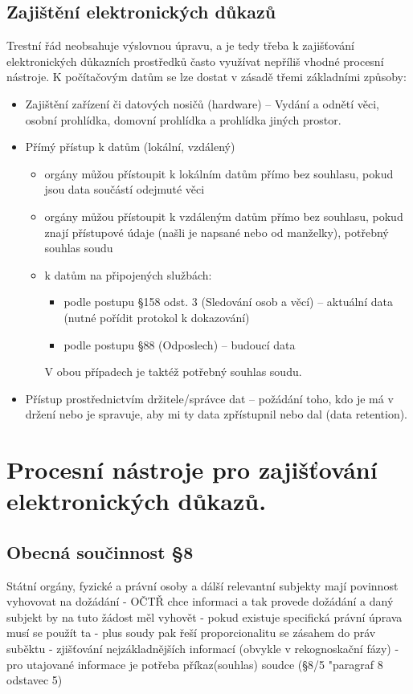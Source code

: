 \subsection{Zajištění elektronických důkazů}
Trestní řád neobsahuje výslovnou úpravu, a je tedy třeba k zajišťování elektronických důkazních prostředků často využívat nepříliš vhodné procesní nástroje. K počítačovým datům se lze dostat v zásadě třemi základními způsoby:
\begin{itemize}
    \item Zajištění zařízení či datových nosičů (hardware) -- Vydání a odnětí věci, osobní prohlídka, domovní prohlídka a prohlídka jiných prostor.
    \item Přímý přístup k datům (lokální, vzdálený)
    \begin{itemize}
        \item orgány můžou přístoupit k lokálním datům přímo bez souhlasu, pokud jsou data součástí odejmuté věci
        \item orgány můžou přístoupit k vzdáleným datům přímo bez souhlasu, pokud znají přístupové údaje (našli je napsané nebo od manželky), potřebný souhlas soudu
        \item k datům na připojených službách:
        \begin{itemize}
            \item podle postupu §158 odst. 3  (Sledování osob a věcí) -- aktuální data (nutné pořídit protokol k dokazování)
            \item podle postupu §88 (Odposlech) -- budoucí data
        \end{itemize}
        V obou případech je taktéž potřebný souhlas soudu.
    \end{itemize}
    \item Přístup prostřednictvím držitele/správce dat -- požádání toho, kdo je má v držení nebo je spravuje, aby mi ty data zpřístupnil nebo dal (data retention).
\end{itemize}

\newpage
\section{Procesní nástroje pro zajišťování elektronických důkazů.}

\subsection{Obecná součinnost §8}
Státní orgány, fyzické a právní osoby a dálší relevantní subjekty mají povinnost vyhovovat na
dožádání - OČTŘ chce informaci a tak provede dožádání a daný subjekt by na tuto žádost měl
vyhovět - pokud existuje specifická právní úprava musí se použít ta - plus soudy pak řeší
proporcionalitu se zásahem do práv suběktu - zjišťování nejzákladnějších informací (obvykle v
rekognoskační fázy) - pro utajované informace je potřeba příkaz(souhlas) soudce (§8/5 "paragraf 8
odstavec 5)
